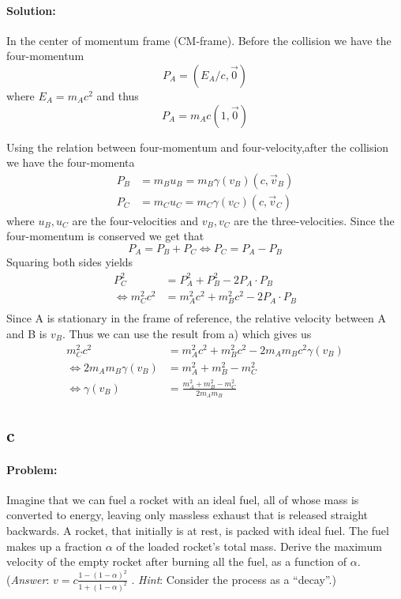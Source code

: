 \paragraph{Solution:} In the center of momentum frame (CM-frame). Before the collision we have the four-momentum
\begin{equation*}
    P_A = (E_A/c, \vec{0})
\end{equation*}
where $E_A = m_A c^2$ and thus
\begin{equation*}
    P_A = m_A c (1, \vec{0})
\end{equation*}

Using the relation between four-momentum and four-velocity,after the collision we have the four-momenta
\begin{align*}
    P_B &= m_B u_B = m_B \gamma(v_B) (c, \vec{v}_B)\\
    P_C &= m_C u_C = m_C \gamma(v_C) (c, \vec{v}_C)
\end{align*}
where $u_B, u_C$ are the four-velocities and $v_B, v_C$ are the three-velocities. Since the four-momentum is conserved we get that 
\begin{equation*}
    P_A = P_B + P_C \iff P_C = P_A - P_B
\end{equation*} 
Squaring both sides yields
\begin{align*}
    P_C^2 &= P_A^2 + P_B^2 - 2 P_A \cdot P_B\\
    \iff m_C^2 c^2  &= m_A^2 c^2 + m_B^2 c^2 - 2 P_A \cdot P_B\\
\end{align*}
Since A is stationary in the frame of reference, the relative velocity between A and B is $v_B$. Thus we can use the result from a) which gives us
\begin{align*}
    m_C^2 c^2 &= m_A^2 c^2 + m_B^2 c^2 - 2 m_A m_B c^2 \gamma(v_B)\\
    \iff 2 m_A m_B \gamma(v_B) &= m_A^2 + m_B^2 - m_C^2\\
    \iff \gamma(v_B) &= \frac{m_A^2 + m_B^2 - m_C^2}{2 m_A m_B}
\end{align*}
\qedsymbol

\subsection{c}
\paragraph{Problem:} Imagine that we can fuel a rocket with an ideal fuel, all of whose mass is converted to energy, leaving only massless exhaust that is released straight backwards. A rocket, that initially is at rest, is packed with ideal fuel. The fuel makes up a fraction $\alpha$ of the
loaded rocket's total mass. Derive the maximum velocity of the empty rocket after burning all the
fuel, as a function of $\alpha$. (\textit{Answer}: $v = c \frac{1- (1-\alpha)^2}{1+ (1-\alpha)^2}$ . \textit{Hint}: Consider the process as a ``decay''.)


